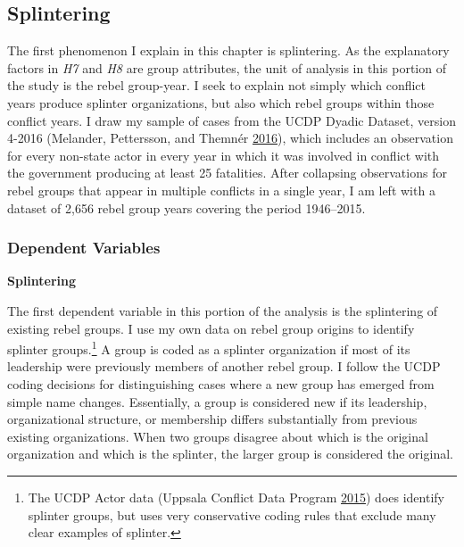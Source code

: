 \documentclass[12pt,]{book}
\let\rmarkdownfootnote\footnote%
\def\footnote{\protect\rmarkdownfootnote}
\theoremstyle{definition}
\theoremstyle{definition}
\theoremstyle{definition}
\theoremstyle{remark}
\begin{document}
\hypertarget{splintering-2}{%
\subsection{Splintering}\label{splintering-2}}

The first phenomenon I explain in this chapter is splintering. As the
explanatory factors in \emph{H7} and \emph{H8} are group attributes, the
unit of analysis in this portion of the study is the rebel group-year. I
seek to explain not simply which conflict years produce splinter
organizations, but also which rebel groups within those conflict years.
I draw my sample of cases from the UCDP Dyadic Dataset, version 4-2016
(Melander, Pettersson, and Themnér
\protect\hyperlink{ref-Melander2016}{2016}), which includes an
observation for every non-state actor in every year in which it was
involved in conflict with the government producing at least 25
fatalities. After collapsing observations for rebel groups that appear
in multiple conflicts in a single year, I am left with a dataset of
2,656 rebel group years covering the period 1946--2015.

\hypertarget{dependent-variables-2}{%
\subsubsection*{Dependent Variables}\label{dependent-variables-2}}

\textbf{Splintering}

The first dependent variable in this portion of the analysis is the
splintering of existing rebel groups. I use my own data on rebel group
origins to identify splinter groups.\footnote{The UCDP Actor data
  (Uppsala Conflict Data Program
  \protect\hyperlink{ref-ucdpactor}{2015}) does identify splinter
  groups, but uses very conservative coding rules that exclude many
  clear examples of splinter.} A group is coded as a splinter
organization if most of its leadership were previously members of
another rebel group. I follow the UCDP coding decisions for
distinguishing cases where a new group has emerged from simple name
changes. Essentially, a group is considered new if its leadership,
organizational structure, or membership differs substantially from
previous existing organizations. When two groups disagree about which is
the original organization and which is the splinter, the larger group is
considered the original.
\end{document}
